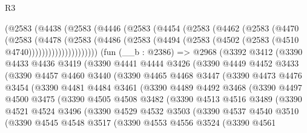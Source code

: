 \begin{lexlean}{R3}
\begin{coremodule}
      (@2583
        (@4438
          (@2583
            (@4446
              (@2583
                (@4454
                  (@2583
                    (@4462
                      (@2583
                        (@4470
                          (@2583
                            (@4478
                              (@2583
                                (@4486
                                  (@2583
                                    (@4494 (@2583 (@4502 (@2583 (@4510 @4740)))))))))))))))))))))
    (fun (__b : @2386) =>
    @2968
      (@3392
        @3412
        (@3390
          @4433
          @4436
          @3419
          (@3390
            @4441
            @4444
            @3426
            (@3390
              @4449
              @4452
              @3433
              (@3390
                @4457
                @4460
                @3440
                (@3390
                  @4465
                  @4468
                  @3447
                  (@3390
                    @4473
                    @4476
                    @3454
                    (@3390
                      @4481
                      @4484
                      @3461
                      (@3390
                        @4489
                        @4492
                        @3468
                        (@3390
                          @4497
                          @4500
                          @3475
                          (@3390
                            @4505
                            @4508
                            @3482
                            (@3390
                              @4513
                              @4516
                              @3489
                              (@3390
                                @4521
                                @4524
                                @3496
                                (@3390
                                  @4529
                                  @4532
                                  @3503
                                  (@3390
                                    @4537
                                    @4540
                                    @3510
                                    (@3390
                                      @4545
                                      @4548
                                      @3517
                                      (@3390
                                        @4553
                                        @4556
                                        @3524
                                        (@3390
                                          @4561

\end{coremodule}
\end{lexlean}
